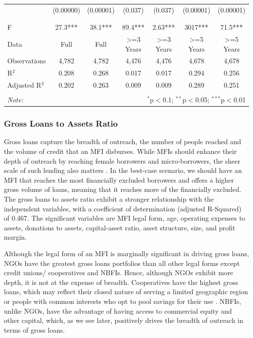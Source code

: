 \documentclass[a4paper, nobind]{templates/ociamthesis}
\begin{document}
\begin{landscape}
\begin{table}[!htbp]
\begin{tabular}{@{\extracolsep{5pt}}lcccccc}
  & (0.00000) & (0.00001) & (0.037) & (0.037) & (0.00001) & (0.00001) \\ 
  & & & & & & \\ 
\hline \\[-1.8ex] 
F & 27.3*** & 38.1*** & 89.4*** & 2.63*** & 3017*** & 71.5*** \\ 
Data & Full & Full & >=3 Years & >=3 Years & >=5 Years & >=5 Years \\ 
Observations & 4,782 & 4,782 & 4,476 & 4,476 & 4,678 & 4,678 \\ 
R$^{2}$ & 0.208 & 0.268 & 0.017 & 0.017 & 0.294 & 0.256 \\ 
Adjusted R$^{2}$ & 0.202 & 0.263 & 0.009 & 0.009 & 0.289 & 0.251 \\ 
\hline 
\hline \\[-1.8ex] 
\textit{Note:}  & \multicolumn{6}{r}{$^{*}$p$<$0.1; $^{**}$p$<$0.05; $^{***}$p$<$0.01} \\ 
\end{tabular} 
\end{table}

\end{landscape}

\hypertarget{gross-loans-to-assets-ratio}{%
\subsubsection{Gross Loans to Assets Ratio}\label{gross-loans-to-assets-ratio}}

Gross loans capture the breadth of outreach, the number of people reached and the volume of credit that an MFI disburses. While MFIs should enhance their depth of outreach by reaching female borrowers and micro-borrowers, the sheer scale of such lending also matters \autocite{d2013unsubsidized}. In the best-case scenario, we should have an MFI that reaches the most financially excluded borrowers and offers a higher gross volume of loans, meaning that it reaches more of the financially excluded. The gross loans to assets ratio exhibit a stronger relationship with the independent variables, with a coefficient of determination (adjusted R-Squared) of 0.467. The significant variables are MFI legal form, age, operating expenses to assets, donations to assets, capital-asset ratio, asset structure, size, and profit margin.

Although the legal form of an MFI is marginally significant in driving gross loans, NGOs have the greatest gross loans portfolios than all other legal forms except credit unions/ cooperatives and NBFIs. Hence, although NGOs exhibit more depth, it is not at the expense of breadth. Cooperatives have the highest gross loans, which may reflect their closed nature of serving a limited geographic region or people with common interests who opt to pool savings for their use \autocite{mckillop2011credit}. NBFIs, unlike NGOs, have the advantage of having access to commercial equity and other capital, which, as we see later, positively drives the breadth of outreach in terms of gross loans.
\end{document}
